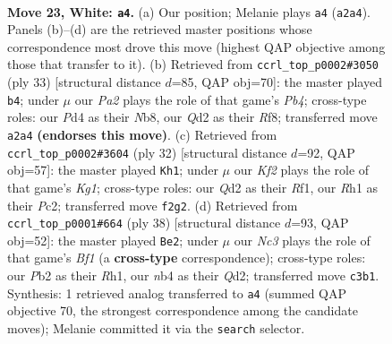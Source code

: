 \documentclass[11pt]{article}
\begin{document}
\clearpage

\begin{figure}[p]\centering
\begin{subfigure}{0.46\textwidth}\centering
\resizebox{\linewidth}{!}{%
\newchessgame
\chessboard[
  setfen={rnb1qrk1/1p6/2p1p3/p2p1p1p/1n1P1P2/2N2NP1/PPPQ1K1P/3R1B1R w - - 0 23},
  showmover=false,
  pgfstyle=straightmove, color=movearrow, markmove={a2-a4}
]}
\caption{}
\end{subfigure}\hfill
\begin{subfigure}{0.46\textwidth}\centering
\resizebox{\linewidth}{!}{%
\newchessgame
\chessboard[
  setfen={rn3rk1/3bqpp1/3p1n2/pp5p/3NPP1P/1PN3P1/P2Q2B1/R4RK1 b - - 0 17},
  showmover=false,
  pgfstyle=straightmove, color=movearrow, markmove={b5-b4}
]}
\caption{}
\end{subfigure}
\\[4pt]
\begin{subfigure}{0.46\textwidth}\centering
\resizebox{\linewidth}{!}{%
\newchessgame
\chessboard[
  setfen={4rr1k/1ppq1ppp/p1nb1n2/P3p3/4P3/2NP1N2/1PPBQ1PP/R4RK1 w - - 3 17},
  showmover=false,
  pgfstyle=straightmove, color=movearrow, markmove={g1-h1}
]}
\caption{}
\end{subfigure}\hfill
\begin{subfigure}{0.46\textwidth}\centering
\resizebox{\linewidth}{!}{%
\newchessgame
\chessboard[
  setfen={r3nrk1/1b2qpp1/p1npp2p/1p6/4P1PP/2N1BP2/PPPQ4/1K1R1B1R w - - 5 20},
  showmover=false,
  pgfstyle=straightmove, color=movearrow, markmove={f1-e2}
]}
\caption{}
\end{subfigure}
\caption{\textbf{Move 23, White: \texttt{a4}.} (a) Our position; Melanie plays \texttt{a4} (\texttt{a2a4}). Panels (b)--(d) are the retrieved master positions whose correspondence most drove this move (highest QAP objective among those that transfer to it). (b) Retrieved from \texttt{ccrl\_top\_p0002\#3050} (ply 33) [structural distance $d$=85, QAP obj=70]: the master played \texttt{b4}; under $\mu$ our \emph{Pa2} plays the role of that game's \emph{Pb4}; cross-type roles: our \emph{P}d4 as their \emph{N}b8, our \emph{Q}d2 as their \emph{R}f8; transferred move \texttt{a2a4} \textbf{(endorses this move)}. (c) Retrieved from \texttt{ccrl\_top\_p0002\#3604} (ply 32) [structural distance $d$=92, QAP obj=57]: the master played \texttt{Kh1}; under $\mu$ our \emph{Kf2} plays the role of that game's \emph{Kg1}; cross-type roles: our \emph{Q}d2 as their \emph{R}f1, our \emph{R}h1 as their \emph{P}c2; transferred move \texttt{f2g2}. (d) Retrieved from \texttt{ccrl\_top\_p0001\#664} (ply 38) [structural distance $d$=93, QAP obj=52]: the master played \texttt{Be2}; under $\mu$ our \emph{Nc3} plays the role of that game's \emph{Bf1} (a \textbf{cross-type} correspondence); cross-type roles: our \emph{P}b2 as their \emph{R}h1, our \emph{n}b4 as their \emph{Q}d2; transferred move \texttt{c3b1}. Synthesis: 1 retrieved analog transferred to \texttt{a4} (summed QAP objective 70, the strongest correspondence among the candidate moves); Melanie committed it via the \texttt{search} selector.}
\label{fig:thought-m44}
\end{figure}
\end{document}
